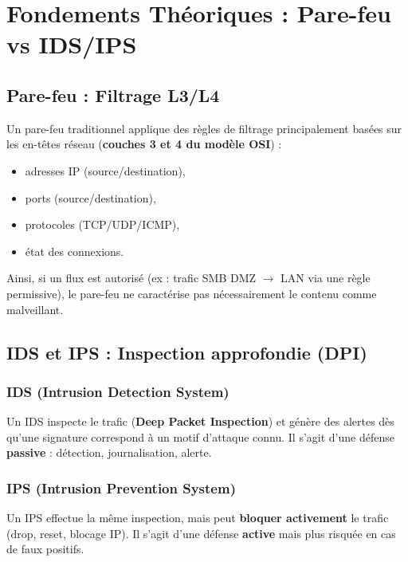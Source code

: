 \documentclass[12pt,a4paper,openany]{report}
\begin{document}
	\chapter{Fondements Théoriques : Pare-feu vs IDS/IPS}
	
	\section{Pare-feu : Filtrage L3/L4}
	
	Un pare-feu traditionnel applique des règles de filtrage principalement basées sur les en-têtes réseau (\textbf{couches 3 et 4 du modèle OSI}) :
	\begin{itemize}
		\item adresses IP (source/destination),
		\item ports (source/destination),
		\item protocoles (TCP/UDP/ICMP),
		\item état des connexions.
	\end{itemize}
	
	Ainsi, si un flux est autorisé (ex : trafic SMB DMZ $\rightarrow$ LAN via une règle permissive), le pare-feu ne caractérise pas nécessairement le contenu comme malveillant.
	
	\section{IDS et IPS : Inspection approfondie (DPI)}
	
	\subsection{IDS (Intrusion Detection System)}
	Un IDS inspecte le trafic (\textbf{Deep Packet Inspection}) et génère des alertes dès qu'une signature correspond à un motif d'attaque connu. Il s'agit d'une défense \textbf{passive} : détection, journalisation, alerte.
	
	\subsection{IPS (Intrusion Prevention System)}
	Un IPS effectue la même inspection, mais peut \textbf{bloquer activement} le trafic (drop, reset, blocage IP). Il s'agit d'une défense \textbf{active} mais plus risquée en cas de faux positifs.
	
\end{document}
